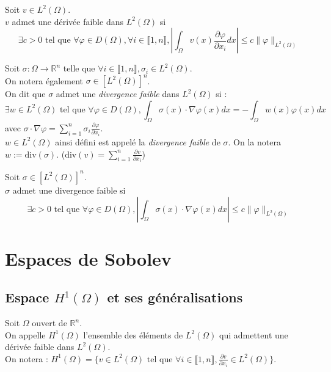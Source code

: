 \documentclass[12pt,a4paper]{article}
\newcommand{\propriete}[2]{%
    \begin{tcolorbox}[colback=white,colframe=green!25!white,title=\textbf{Propriété #1}, coltitle=black]
        #2
    \end{tcolorbox}
}
\newcommand{\definition}[2]{%
    \begin{tcolorbox}[colback=white,colframe=blue!25!white,title=\textbf{Définition #1}, coltitle=black]
        #2
    \end{tcolorbox}
}
\begin{document}
\propriete{}{
    Soit $v \in L^2(\Omega)$. \\
    $v$ admet une dérivée faible dans $L^2(\Omega)$ si
    $$
    \exists c > 0 \text{ tel que } \forall \varphi \in D(\Omega), \forall i \in \llbracket 1, n \rrbracket, \left| \int_{\Omega} v(x) \frac{\partial \varphi}{\partial x_i} dx \right| \leq c \| \varphi \|_{L^2(\Omega)}
    $$
}

\definition{- Divergence faible}{
    Soit $\sigma : \Omega \rightarrow \mathbb{R}^n$ telle que $\forall i \in \llbracket 1, n \rrbracket, \sigma_i \in L^2(\Omega)$. \\
    On notera également $\sigma \in \left[L^2(\Omega)\right]^n$. \\
    On dit que $\sigma$ admet une \textit{divergence faible} dans $L^2(\Omega)$ si :
    $$
    \exists w \in L^2(\Omega) \text{ tel que } \forall \varphi \in D(\Omega), \int_{\Omega} \sigma(x) \cdot \nabla \varphi(x) dx = - \int_{\Omega} w(x) \varphi(x) dx
    $$
    avec $\sigma \cdot \nabla \varphi = \sum_{i=1}^n \sigma_i \frac{\partial \varphi}{\partial x_i}$. \\

    $w \in L^2(\Omega)$ ainsi défini est appelé la \textit{divergence faible} de $\sigma$. On la notera $w := \text{div}(\sigma)$. ($\text{div}(v) = \sum_{i=1}^n \frac{\partial v}{\partial x_i}$)
}

\propriete{}{
    Soit $\sigma \in \left[L^2(\Omega)\right]^n$. \\
    $\sigma$ admet une divergence faible si
    $$
    \exists c > 0 \text{ tel que } \forall \varphi \in D(\Omega), \left| \int_{\Omega} \sigma(x) \cdot \nabla \varphi(x) dx \right| \leq c \| \varphi \|_{L^2(\Omega)}
    $$
}


\section{Espaces de Sobolev}

\subsection{Espace $H^1(\Omega)$ et ses généralisations}

\definition{}{
    Soit $\Omega$ ouvert de $\mathbb{R}^n$. \\
    On appelle $H^1(\Omega)$ l'ensemble des éléments de $L^2(\Omega)$ qui admettent une dérivée faible dans $L^2(\Omega)$. \\
    On notera : $H^1(\Omega) = \{v \in L^2(\Omega) \text{ tel que } \forall i \in \llbracket 1, n \rrbracket, \frac{\partial v}{\partial x_i} \in L^2(\Omega)\}$.
}
\end{document}
